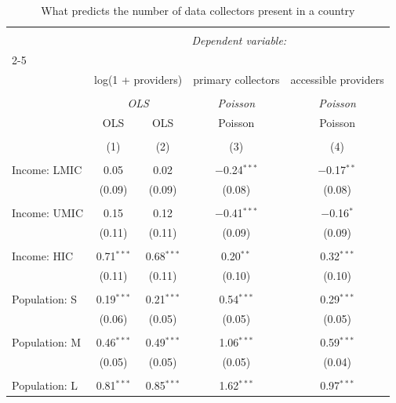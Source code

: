 
\begin{table}[!htbp] \centering 
  \caption{What predicts the number of data collectors present in a country} 
  \label{} 
\begin{tabular}{@{\extracolsep{5pt}}lcccc} 
\\[-1.8ex]\hline 
\hline \\[-1.8ex] 
 & \multicolumn{4}{c}{\textit{Dependent variable:}} \\ 
\cline{2-5} 
\\[-1.8ex] & \multicolumn{2}{c}{log(1 + providers)} & primary collectors & accessible providers \\ 
\\[-1.8ex] & \multicolumn{2}{c}{\textit{OLS}} & \textit{Poisson} & \textit{Poisson} \\ 
 & OLS & OLS & Poisson & Poisson \\ 
\\[-1.8ex] & (1) & (2) & (3) & (4)\\ 
\hline \\[-1.8ex] 
 Income: LMIC & 0.05 & 0.02 & $-$0.24$^{***}$ & $-$0.17$^{**}$ \\ 
  & (0.09) & (0.09) & (0.08) & (0.08) \\ 
  & & & & \\ 
 Income: UMIC & 0.15 & 0.12 & $-$0.41$^{***}$ & $-$0.16$^{*}$ \\ 
  & (0.11) & (0.11) & (0.09) & (0.09) \\ 
  & & & & \\ 
 Income: HIC & 0.71$^{***}$ & 0.68$^{***}$ & 0.20$^{**}$ & 0.32$^{***}$ \\ 
  & (0.11) & (0.11) & (0.10) & (0.10) \\ 
  & & & & \\ 
 Population: S & 0.19$^{***}$ & 0.21$^{***}$ & 0.54$^{***}$ & 0.29$^{***}$ \\ 
  & (0.06) & (0.05) & (0.05) & (0.05) \\ 
  & & & & \\ 
 Population: M & 0.46$^{***}$ & 0.49$^{***}$ & 1.06$^{***}$ & 0.59$^{***}$ \\ 
  & (0.05) & (0.05) & (0.05) & (0.04) \\ 
  & & & & \\ 
 Population: L & 0.81$^{***}$ & 0.85$^{***}$ & 1.62$^{***}$ & 0.97$^{***}$ \\ 

\end{tabular}
\end{table}
